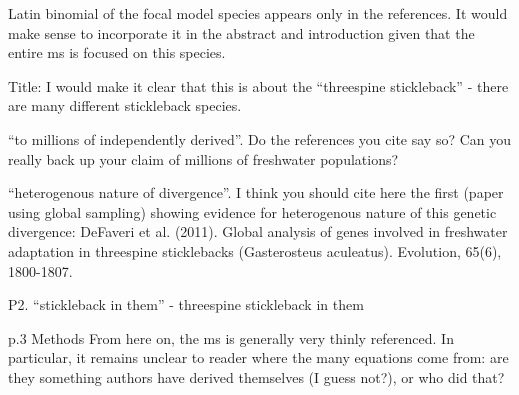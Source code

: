 \begin{point}{}
Latin binomial of the focal model species appears only in the references. It would make sense to incorporate it in the abstract and introduction given that the entire ms is focused on this species.
\end{point}


\begin{point}{Title:}
I would make it clear that this is about the ``threespine stickleback'' - there are many different stickleback species.
\end{point}


\begin{point}{\revref}
``to millions of independently derived''. Do the references you cite say so? Can you really back up your claim of millions of freshwater populations?
\end{point}


\begin{point}{\revref}
``heterogenous nature of divergence''. I think you should cite here the first (paper using global sampling) showing evidence for heterogenous nature of this genetic divergence: DeFaveri et al. (2011). Global analysis of genes involved in freshwater adaptation in threespine sticklebacks (Gasterosteus aculeatus). Evolution, 65(6), 1800-1807.
\end{point}


\begin{point}{\revref}
P2. ``stickleback in them'' - threespine stickleback in them
\end{point}


\begin{point}{p.3 Methods}
From here on, the ms is generally very thinly referenced. In particular, it remains unclear to reader where the many equations come from: are they something authors have derived themselves (I guess not?), or who did that?
\end{point}

